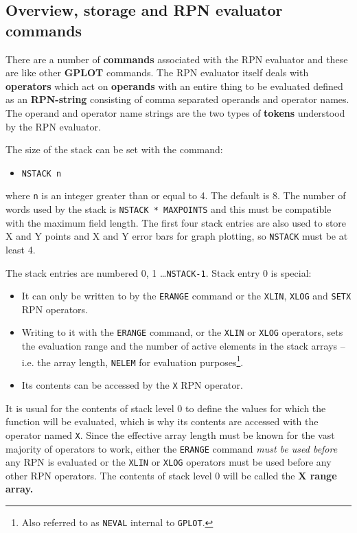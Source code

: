 \documentclass[a4paper,twoside,11pt]{article}
\newcommand{\newpara}{\par\vspace{4mm}\noindent}
\newcommand{\textttc}[1]{\texttt{\textcolor{OurRed}{#1}}}
\begin{document}
\subsection{Overview, storage and RPN evaluator commands}
There are a number of \textbf{commands} associated with the RPN evaluator and these are like other \textbf{GPLOT} commands.
The RPN evaluator itself deals with \textbf{operators} which act on \textbf{operands} with an entire thing to be evaluated defined
as an \textbf{RPN-string} consisting of comma separated operands and operator names. The operand and operator name strings are
the two types of \textbf{tokens} understood by the RPN evaluator. 
\newpara
The size of the stack can be set with the command:
\begin{itemize}
\item \textttc{NSTACK n}
\end{itemize}
where \texttt{n} is an integer greater than or equal to 4. The default is 8. The number of words used by the stack is 
\texttt{NSTACK * MAXPOINTS}
and this must be compatible with the maximum field length. The first four stack entries are also used to store X and Y points 
and X and Y error bars for graph plotting, so \texttt{NSTACK} must be at least 4.
\newpara
The stack entries are numbered 0, 1 \ldots \texttt{NSTACK-1}. Stack entry 0 is special:
\begin{itemize}
\item It can only be written to by the \textttc{ERANGE} command or the \textttc{XLIN}, \textttc{XLOG} and \textttc{SETX} 
RPN operators.
\item Writing to it with the \textttc{ERANGE} command, or the \textttc{XLIN} or \textttc{XLOG} operators,
  sets the evaluation range and the number of active elements in
the stack arrays -- i.e. the array length, \texttt{NELEM} for evaluation purposes\footnote{Also referred to as
\texttt{NEVAL} internal to \texttt{GPLOT}.}.
\item Its contents can be accessed by the \textttc{X} RPN operator.
\end{itemize}
It is usual for the contents of stack level 0 to define the values for which the function will be evaluated, which is why its contents
are accessed with the operator named \textttc{X}. Since the effective array length must be known for the vast majority of operators to
work, either the \textttc{ERANGE} command \emph{must be used before} any RPN is evaluated or the \textttc{XLIN} or \textttc{XLOG} 
operators must be used before any other RPN operators. The contents of stack level 0 will be called the \textbf{X range array.}
\end{document}

